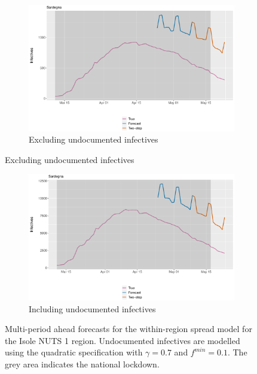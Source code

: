 \documentclass[12pt]{article}
\begin{document}
\begin{appendices}
        \begin{figure}[H]
    	    \centering
    	    \begin{subfigure}{\textwidth}
    	      \centering
    	      \includegraphics[width=0.94\linewidth]{output/model_within_lag14_forecast_full_Isole.pdf}
    	      \caption{Excluding undocumented infectives}
    	      \label{fig:forecast_full_within_isole_regular}
    	    \end{subfigure}
        \end{figure}
        \begin{figure}[H]\ContinuedFloat
    	    \begin{subfigure}{\textwidth}
    	      \centering
    	      \includegraphics[width=0.94\linewidth]{output/model_within_lag14_forecast_full_Isole_UndocQuadratic.pdf}
    	      \caption{Including undocumented infectives}
    	      \label{fig:forecast_full_within_isole_undoc}
    	    \end{subfigure}
    	    \caption{Multi-period ahead forecasts for the within-region spread model for the Isole NUTS 1 region. Undocumented infectives are modelled using the quadratic specification with $\gamma = 0.7$ and $f^{min}=0.1$. The grey area indicates the national lockdown.}
    	    \label{fig:forecast_full_within_isole}
        \end{figure}
		

\end{appendices}
\end{document}
